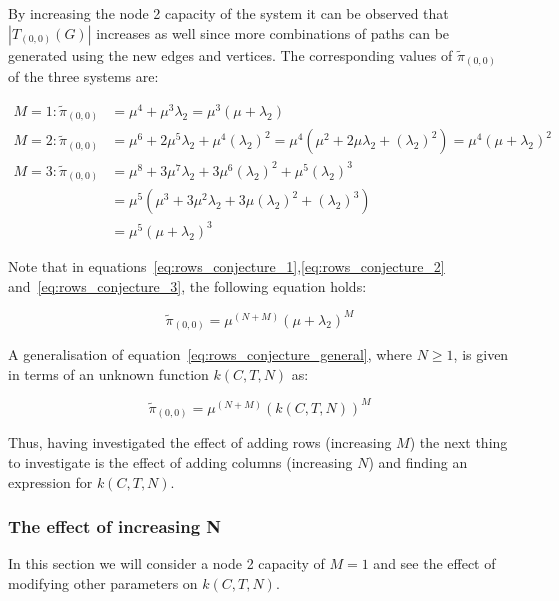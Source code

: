 By increasing the node 2 capacity of the system it can be observed that
\(|T_{(0,0)}(G)|\) increases as well since more combinations of paths can be
generated using the new edges and vertices.
The corresponding values of \(\tilde{\pi}_{(0,0)}\) of the three systems are:

\begin{align}
    M = 1: \tilde{\pi}_{(0,0)} &= \mu^4 + \mu^3 \lambda_2 =
    \mu^3 (\mu + \lambda_2) \label{eq:rows_conjecture_1}\\
    M = 2: \tilde{\pi}_{(0,0)} &= \mu^6 + 2\mu^5 \lambda_2 + \mu^4 (\lambda_2)^2
    = \mu^4(\mu^2 + 2\mu \lambda_2 + (\lambda_2)^2)
    = \mu^4 (\mu + \lambda_2) ^ 2 \label{eq:rows_conjecture_2}\\
    M = 3: \tilde{\pi}_{(0,0)} &= \mu^8 + 3 \mu^7 \lambda_2 +
    3 \mu^6 (\lambda_2)^2 + \mu^5(\lambda_2)^3 \nonumber \\
    &= \mu^5 (\mu^3 + 3 \mu ^2 \lambda_2 + 3 \mu (\lambda_2)^2 + (\lambda_2)^3)
    \nonumber \\
    &= \mu^5 (\mu + \lambda_2) ^ 3 \label{eq:rows_conjecture_3}
\end{align}

Note that in equations~\eqref{eq:rows_conjecture_1},\eqref{eq:rows_conjecture_2}
and~\eqref{eq:rows_conjecture_3}, the following equation holds:

\begin{equation}\label{eq:rows_conjecture_general}
    \tilde{\pi}_{(0,0)} = \mu^{(N+M)} (\mu + \lambda_2)^M
\end{equation}

A generalisation of equation~\eqref{eq:rows_conjecture_general}, where \(N \geq
1\), is given in terms of an unknown function \(k(C,T,N)\) as:

\begin{equation}
    \tilde{\pi}_{(0,0)} = \mu^{(N+M)} (k(C,T,N))^M
\end{equation}

Thus, having investigated the effect of adding rows (increasing \(M\)) the
next thing to investigate is the effect of adding columns (increasing \(N\))
and finding an expression for \(k(C,T,N)\).

\subsubsection{The effect of increasing N}
In this section we will consider a node 2 capacity of \(M=1\) and see the
effect
of modifying other parameters on \(k(C, T, N)\).

